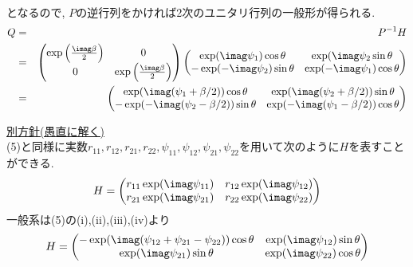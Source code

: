 \documentclass[dvipdfmx,titlepage, 11pt, a4paper]{jsarticle}%
\begin{document}
\begin{enumerate}[(1)]
\begin{eqnarray*}
    \end{eqnarray*}
    となるので, $P$の逆行列をかければ2次のユニタリ行列の一般形が得られる.
    \begin{eqnarray*}
      Q &=& P^{-1}H\\
        &=& \begin{pmatrix}\exp\left(\frac{\imag \beta}{2}\right)&0\\0&\exp\left(\frac{\imag \beta}{2}\right)\end{pmatrix}\begin{pmatrix}\exp(\imag\psi_{1})\cos\theta&\exp(\imag\psi_{2}\sin\theta\\-\exp(-\imag\psi_{2})\sin\theta&\exp(-\imag\psi_{1})\cos\theta\end{pmatrix}\\
        &=& \begin{pmatrix}\exp(\imag(\psi_{1}+\beta/2))\cos\theta&\exp(\imag(\psi_{2}+\beta/2))\sin\theta\\-\exp(-\imag(\psi_{2}-\beta/2))\sin\theta&\exp(-\imag(\psi_{1}-\beta/2))\cos\theta\end{pmatrix}
    \end{eqnarray*}
    \vspace{0.5cm}

    \noindent \underline{別方針(愚直に解く)}\\
    (5)と同様に実数$r_{11},r_{12},r_{21},r_{22},\psi_{11},\psi_{12},\psi_{21},\psi_{22}$を用いて次のように$H$を表すことができる.
    \begin{eqnarray*}
      H=\begin{pmatrix}r_{11}\exp(\imag \psi_{11})&r_{12}\exp(\imag \psi_{12})\\r_{21}\exp(\imag \psi_{21})&r_{22}\exp(\imag \psi_{22})\end{pmatrix}
    \end{eqnarray*}
    一般系は(5)の(i),(ii),(iii),(iv)より
    \begin{eqnarray*}
      H=\begin{pmatrix}-\exp(\imag(\psi_{12}+\psi_{21}-\psi_{22}))\cos\theta&\exp(\imag\psi_{12})\sin\theta\\\exp(\imag \psi_{21})\sin\theta&\exp(\imag\psi_{22})\cos\theta\end{pmatrix}
    \end{eqnarray*}
\end{enumerate}

\newpage

\section{}%
\end{document}
